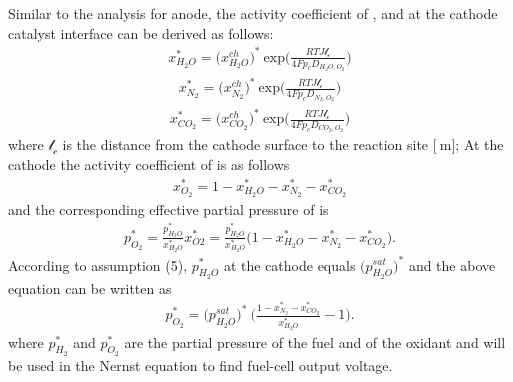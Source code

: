 \documentclass[12pt,a4paper]{scrartcl}
\begin{document}
\begin{onehalfspace}
Similar to the analysis for anode, the activity coefficient of ,  and  at the cathode catalyst interface can be derived as follows:
\begin{equation}\label{eq8}
	\begin{aligned}
		x_{H_2O}^*=\Big(x_{H_2O}^{ch}\Big)^*\ \text{exp}\Bigg(\frac{RTJ\mathcal{l_c}}{4Fp_cD_{H_2O,O_2}}\Bigg)
	\end{aligned}
\end{equation}
\begin{equation}\label{eq9}
	\begin{aligned}
		x_{N_2}^*=\Big(x_{N_2}^{ch}\Big)^*\ \text{exp}\Bigg(\frac{RTJ\mathcal{l_c}}{4Fp_cD_{N_2,O_2}}\Bigg)
	\end{aligned}
\end{equation}
\begin{equation}\label{eq10}
	\begin{aligned}
		x_{CO_2}^*=\Big(x_{CO_2}^{ch}\Big)^*\ \text{exp}\Bigg(\frac{RTJ\mathcal{l_c}}{4Fp_cD_{CO_2,O_2}}\Bigg)
	\end{aligned}
\end{equation}
where $\mathcal{l_c}$ is the distance from the cathode surface to the reaction site $\Big[\SI{}{\meter}\Big]$; At the cathode the activity coefficient of  is as follows
\begin{equation}\label{eq11}
	\begin{aligned}
		x_{O_2}^*=1-x_{H_2O}^*-x_{N_2}^*-x_{CO_2}^*
	\end{aligned}
\end{equation}
\noindent and the corresponding effective partial pressure of  is 
\begin{equation}\label{eq12}
	\begin{aligned}
		p_{O_2}^* = \frac{p_{H_2O}^*}{x_{H_2O}^*} x_{O2}^*=\frac{p_{H_2O}^*}{x_{H_2O}^*}\Big(1-x_{H_2O}^*-x_{N_2}^*-x_{CO_2}^*\Big).
	\end{aligned}
\end{equation}
According to assumption (5), $p_{H_2O}^*$ at the cathode equals $\Big(p_{H_2O}^{sat}\Big)^*$ and the above equation can be written as
\begin{equation}\label{eq13}
	\begin{aligned}
		p_{O_2}^* = \Big(p_{H_2O}^{sat}\Big)^*\ \Big(\frac{1-x_{N_2}^*-x_{CO_2}^*}{x_{H_2O}^*}-1\Big).
	\end{aligned}
\end{equation}
where $p_{H_2}^*$ and $p_{O_2}^*$ are the partial pressure of the fuel and of the oxidant and will be used in the Nernst equation to find fuel-cell output voltage. 


\end{onehalfspace}
\end{document}

